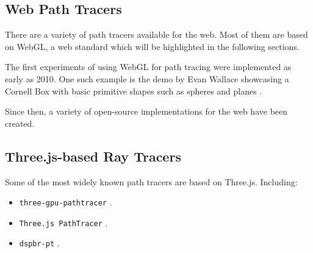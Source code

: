 \subsection*{Web Path Tracers}

There are a variety of path tracers available for the web. Most of them are based on WebGL, a web standard which will be highlighted in the following sections.

The first experiments of using WebGL for path tracing were implemented as early as 2010. One such example is the demo by Evan Wallace showcasing a Cornell Box with basic primitive shapes such as spheres and planes \cite{pathTracerWallace}.

Since then, a variety of open-source implementations for the web have been created.

\subsection*{Three.js-based Ray Tracers}

Some of the most widely known path tracers are based on Three.js. Including:

\begin{itemize}
    \item {\texttt{three-gpu-pathtracer}} \cite{ThreeJsPathTracerJohnson}.
    \item{\texttt{Three.js PathTracer}} \cite{ThreeJsPathTracerLoftis}.
    \item {\texttt{dspbr-pt}} \cite{PathTracerDassault}.
  \end{itemize}

